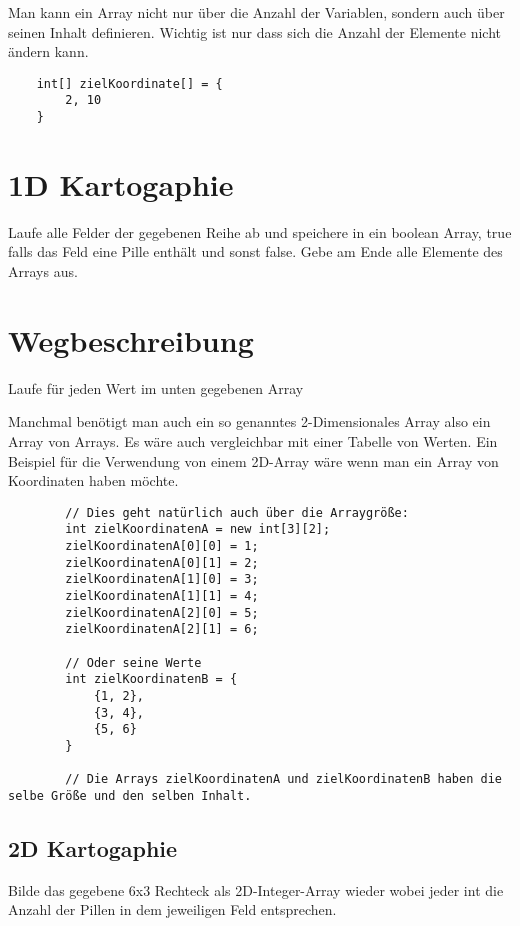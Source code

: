 \begin{questions}
    Man kann ein Array nicht nur über die Anzahl der Variablen, sondern auch über seinen Inhalt definieren. Wichtig ist nur dass sich die Anzahl der Elemente nicht ändern kann.

    \begin{lstlisting}
    int[] zielKoordinate[] = {
        2, 10
    }
    \end{lstlisting}

    \begin{parts}
        \part{1D Kartogaphie}
        Laufe alle Felder der gegebenen Reihe ab und speichere in ein boolean Array, true falls das Feld eine Pille enthält und sonst false. Gebe am Ende alle Elemente des Arrays aus.

        \part{Wegbeschreibung}
        Laufe für jeden Wert im unten gegebenen Array

    \end{parts}



    Manchmal benötigt man auch ein so genanntes 2-Dimensionales Array also ein Array von Arrays. Es wäre auch vergleichbar mit einer Tabelle von Werten. Ein Beispiel für die Verwendung von einem 2D-Array wäre wenn man ein Array von Koordinaten haben möchte.

    \begin{lstlisting}
        // Dies geht natürlich auch über die Arraygröße:
        int zielKoordinatenA = new int[3][2];
        zielKoordinatenA[0][0] = 1;
        zielKoordinatenA[0][1] = 2;
        zielKoordinatenA[1][0] = 3;
        zielKoordinatenA[1][1] = 4;
        zielKoordinatenA[2][0] = 5;
        zielKoordinatenA[2][1] = 6;

        // Oder seine Werte
        int zielKoordinatenB = {
            {1, 2},
            {3, 4},
            {5, 6}
        }

        // Die Arrays zielKoordinatenA und zielKoordinatenB haben die selbe Größe und den selben Inhalt.
    \end{lstlisting}

    \begin{parts}
        \part{2D Kartogaphie}
        Bilde das gegebene 6x3 Rechteck als 2D-Integer-Array wieder wobei jeder int die Anzahl der Pillen in dem jeweiligen Feld entsprechen.


\end{parts}
\end{questions}
